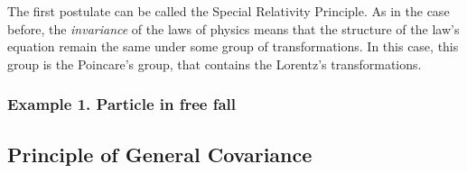 \documentclass[11pt, letterpaper]{article}
\begin{document}
The first postulate can be called the Special Relativity Principle. As in the case before, the \textit{invariance} of the laws of physics means that the structure of the law's equation remain the same under some group of transformations. In this case, this group is the Poincare's group, that contains the Lorentz's transformations. 

\subsubsection*{Example 1. Particle in free fall}

\subsection*{Principle of General Covariance}




\end{document}
